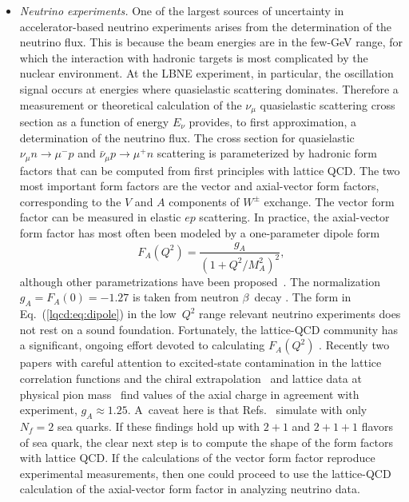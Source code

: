 \begin{itemize}
\item {\it Neutrino experiments.}  One of the largest sources of uncertainty in accelerator-based
neutrino experiments arises from the determination of the neutrino flux.
This is because the beam energies are in the few-GeV range, for which the interaction with hadronic targets
is most complicated by the nuclear environment.
At the LBNE experiment, in particular, the oscillation signal occurs at energies where quasielastic
scattering dominates.
Therefore a measurement or theoretical calculation of the $\nu_\mu$ quasielastic scattering cross section as
a function of energy $E_\nu$ provides, to first approximation, a determination of the neutrino flux.
The cross section for quasielastic $\nu_\mu n \to \mu^-p$ and $\bar{\nu}_\mu p\to \mu^+n$ scattering is 
parameterized by hadronic form factors that can be computed from first principles with lattice QCD.
The two most important form factors are the vector and axial-vector form factors, corresponding to the $V$ 
and $A$ components of $W^\pm$ exchange.
The vector form factor can be measured in elastic $ep$ scattering.
In practice, the axial-vector form factor has most often been modeled by a one-parameter dipole 
form~\cite{LlewellynSmith:1971zm}
\begin{equation}
    F_A(Q^2) = \frac{g_A}{(1+Q^2/M_A^2)^2},
    \label{lqcd:eq:dipole}
\end{equation}
although other parametrizations have been
proposed~\cite{Kelly:2004hm,Bradford:2006yz,Bodek:2007ym,Bhattacharya:2011ah}.
The normalization $g_A=F_A(0)=-1.27$ is taken from neutron $\beta$~decay \cite{Beringer:1900zz}.
The form in Eq.~(\ref{lqcd:eq:dipole}) in the low~$Q^2$ range relevant neutrino experiments does not rest on a
sound foundation.
Fortunately, the lattice-QCD community has a significant, ongoing effort devoted to calculating $F_A(Q^2)$ 
\cite{Khan:2006de,Yamazaki:2009zq,Bratt:2010jn,Alexandrou:2010hf,Alexandrou:2013joa}.
Recently two papers with careful attention to excited-state contamination in the lattice correlation functions and the chiral extrapolation~\cite{Capitani:2012gj} and 
lattice data at physical pion mass~\cite{Horsley:2013ayv} find values of the axial charge in agreement with experiment, $g_A\approx1.25$.
A~caveat here is that Refs.~\cite{Capitani:2012gj,Horsley:2013ayv} simulate with only $N_f=2$ sea quarks.
If these findings hold up with $2+1$ and $2+1+1$ flavors of sea quark, the clear next step is to compute the 
shape of the form factors with lattice QCD.
If the calculations of the vector form factor reproduce experimental measurements, then one could proceed to 
use the lattice-QCD calculation of the axial-vector form factor in analyzing neutrino data.


\end{itemize}
